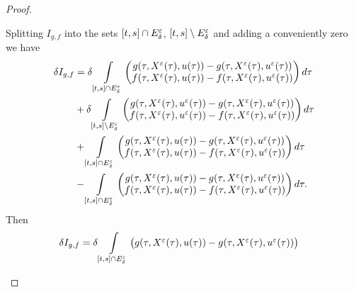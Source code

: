 \begin{proof}
\begin{asparaenum}
        Splitting  $I_{g,f}$ into the sets $[t,s]\cap E_{\delta}^{\varepsilon}$, 
        $[t,s]\setminus E_{\delta}^{\varepsilon}$ and adding a conveniently zero we have
        \begin{align*}
            \delta I_{g,f}
            &=  \delta \int\limits_{[t,s]\cap E_{\delta}^{\veps}} %
                \begin{pmatrix}
                    g(\tau, X^{\veps}(\tau), u(\tau)) - g(\tau, X^{\veps}(\tau), u^{\veps}(\tau)) \\
                    f(\tau, X^{\veps}(\tau), u(\tau)) - f(\tau, X^{\veps}(\tau), u^{\veps}(\tau)) 
                \end{pmatrix} d\tau \\ 
            &+  \delta \int\limits_{[t,s]\setminus E_{\delta}^{\veps}} %
                \begin{pmatrix}
                    g(\tau, X^{\veps}(\tau), u^{\veps}(\tau)) - g(\tau, X^{\veps}(\tau), u^{\veps}(\tau)) \\
                    f(\tau, X^{\veps}(\tau), u^{\veps}(\tau)) - f(\tau, X^{\veps}(\tau), u^{\veps}(\tau)) 
                \end{pmatrix} d\tau \\ 
            &+  \int\limits_{[t,s]\cap E_{\delta}^{\veps}} %
                \begin{pmatrix}
                    g(\tau, X^{\veps}(\tau), u(\tau)) - g(\tau, X^{\veps}(\tau), u^{\veps}(\tau)) \\
                    f(\tau, X^{\veps}(\tau), u(\tau)) - f(\tau, X^{\veps}(\tau), u^{\veps}(\tau)) 
                \end{pmatrix} d\tau \\
            &- \int\limits_{[t,s]\cap E_{\delta}^{\veps}} %
                \begin{pmatrix}
                    g(\tau, X^{\veps}(\tau), u(\tau)) - g(\tau, X^{\veps}(\tau), u^{\veps}(\tau)) \\
                    f(\tau, X^{\veps}(\tau), u(\tau)) - f(\tau, X^{\veps}(\tau), u^{\veps}(\tau)) 
                \end{pmatrix} d\tau. 
        \end{align*}
        Then 
        \begin{align*}
            \delta I_{g,f} &= \delta \int\limits_{[t,s]\cap E_{\delta}^{\veps}} %
                \begin{pmatrix}
                    g(\tau, X^{\veps}(\tau), u(\tau)) - g(\tau, X^{\veps}(\tau), u^{\veps}(\tau)) \\

\end{pmatrix}
\end{align*}
\end{asparaenum}
\end{proof}
